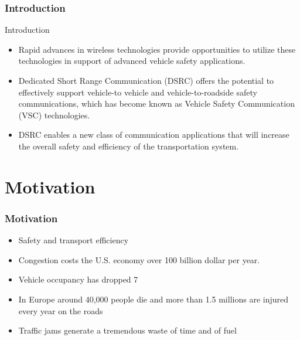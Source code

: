 \documentclass{beamer}
\begin{document}
\begin{frame}
\frametitle{Introduction}
\begin{block}{Introduction}
\begin{itemize}
\item Rapid advances in wireless technologies provide opportunities to utilize these technologies in support of advanced vehicle safety applications.\\
\item Dedicated Short Range Communication (DSRC) offers the potential to effectively support vehicle-to vehicle and vehicle-to-roadside safety communications, which has become known as Vehicle Safety Communication (VSC) technologies.\\
\item DSRC enables a new class of communication applications that will increase the overall safety and efficiency of the transportation system.\\

\end{itemize}
\end{block}

\end{frame}








\section{Motivation}
\begin{frame}
	\frametitle{Motivation}
	\begin{block}{}
		\begin{itemize}
			\item Safety and transport efficiency
			
			\item Congestion costs the U.S. economy over 100 billion dollar  per year.
			
		   \item Vehicle occupancy has dropped 7%
			
		   \item In Europe around 40,000 people die and more than 1.5 millions are injured every year on the roads
			
		    \item Traffic jams generate a tremendous waste of time and of fuel
			
		\end{itemize}
	\end{block}
	
\end{frame}
\end{document}
